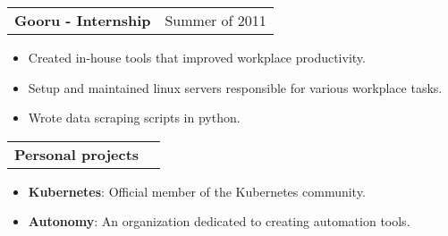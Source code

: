 \begin{tabular}{l r}
	\textbf{Gooru - Internship} & Summer of 2011 \\
\end{tabular}
\begin{itemize}
	\item Created in-house tools that improved workplace productivity.
	\item Setup and maintained linux servers responsible for various workplace tasks.
	\item Wrote data scraping scripts in python.
\end{itemize}

\begin{tabular}{l r}
	\textbf{Personal projects} &   \\
\end{tabular}
\begin{itemize}
	\item \textbf{Kubernetes}: Official member of the Kubernetes community.
	\item \textbf{Autonomy}: An organization dedicated to creating automation tools.
\end{itemize}

